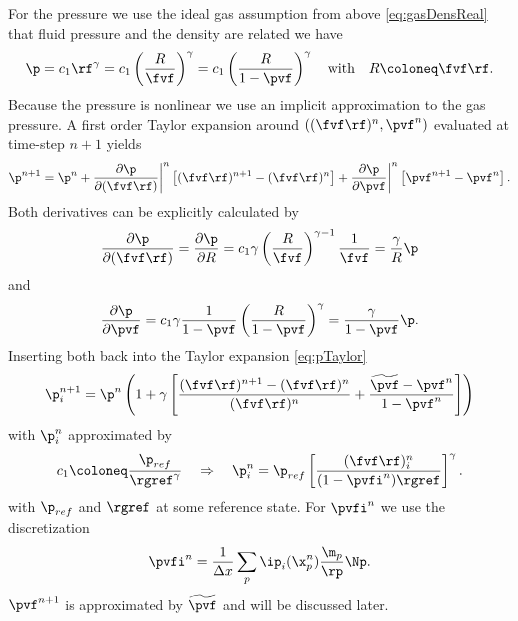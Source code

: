 For the pressure we use the ideal gas assumption from above \eqref{eq:gasDensReal} that fluid pressure and the density are related we have
\begin{equation}
    \p = c_1 \rf^\gamma = c_1 \left( \dfrac{R}{\fvf}\right)^\gamma = c_1 \left( \dfrac{R}{1 - \pvf}\right)^\gamma \quad \text{with} \quad R \coloneq \fvf \rf.
\end{equation}
Because the pressure is nonlinear we use an implicit approximation to the gas pressure. 
A first order Taylor expansion around $((\fvf \rf)^{n},\pvf^n)$  evaluated at time-step $n+1$ yields
\begin{equation}
\label{eq:pTaylor}
    \p^{n+1} = \p^n + \dfrac{\partial \p}{\partial (\fvf \rf)}\bigg|^n \left[ (\fvf \rf )^{n+1} - (\fvf \rf)^n \right] +\dfrac{\partial \p}{\partial \pvf}\bigg|^n \left[ \pvf  ^{n+1} - \pvf^n \right].
\end{equation}
Both derivatives can be explicitly calculated by
\begin{equation*}
    \dfrac{\partial \p}{\partial (\fvf \rf)} = \dfrac{\partial \p}{\partial R} = c_1 \gamma \left( \dfrac{R}{\fvf}\right)^{\gamma -1} \dfrac{1}{\fvf}= \dfrac{\gamma}{R} \p
\end{equation*}
and
\begin{equation*}
    \dfrac{\partial \p}{\partial \pvf} = c_1 \gamma \dfrac{1}{1- \pvf} \left( \dfrac{R}{1 - \pvf}\right)^\gamma = \dfrac{\gamma}{1-\pvf} \p.
\end{equation*}
Inserting both back into the Taylor expansion \eqref{eq:pTaylor}
\begin{equation}
    \p_i^{n+1} = \p^n \left( 1 + \gamma \left[\dfrac{(\fvf \rf)^{n+1} - (\fvf \rf)^{n}}{(\fvf \rf)^n} + \dfrac{\widetilde{\pvf} - \pvf^n}{1 - \pvf^n} \right] \right)
\end{equation}
with $\p_i^{n}$ approximated by
\begin{equation*}
    c_1 \coloneq \dfrac{\p_{ref}}{\rgref^\gamma} \quad  \Rightarrow \quad \p_i^n = \p_{ref} \left[ \dfrac{(\fvf \rf )_i^n}{(1- \pvfi^n)\rgref} \right]^\gamma.
\end{equation*}
with $\p_{ref}$ and $\rgref$ at some reference state. For $\pvfi^n$ we use the discretization
\begin{equation*}
    \pvfi^n = \dfrac{1}{\Delta x} \sum_p \ip_i(\x_p^n) \dfrac{\m_p}{\rp} \Np.
\end{equation*}
$\pvf^{n+1}$ is approximated by $\widetilde{\pvf}$ and will be discussed later. 

